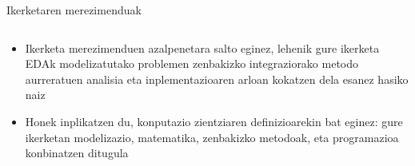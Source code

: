 \documentclass[
 10pt,%
 compress,%
 t,       %
 xcolor=svgnames
]{beamer}
\theoremstyle{definition} \newtheorem{definicion}{Definicion}[section]
\theoremstyle{propiedades} \newtheorem{propiedades}{Propiedades}[section]
\begin{document}
\begin{frame}[fragile]{Ikerketaren merezimenduak}
\begin{columns}
\end{columns}





\note
{
	
\begin{itemize}
	
	\medskip
	\item Ikerketa merezimenduen azalpenetara salto eginez, lehenik gure ikerketa EDAk modelizatutako problemen zenbakizko integraziorako metodo aurreratuen analisia eta inplementazioaren arloan kokatzen dela esanez hasiko naiz
	
	
	
	\medskip
	\item Honek inplikatzen du, konputazio zientziaren definizioarekin bat eginez: gure ikerketan modelizazio, matematika, zenbakizko metodoak, eta programazioa konbinatzen ditugula
	
	  
\end{itemize}

 


}




\end{frame}

\end{document}
